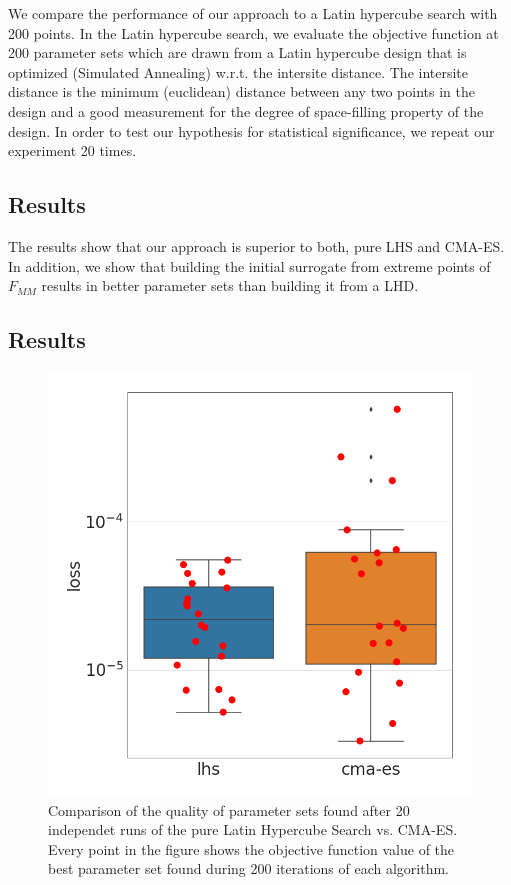 \documentclass[preprint,12pt]{elsarticle}
\begin{document}

We compare the performance of our approach to a Latin hypercube search with 200 points. In the Latin hypercube search, we evaluate the objective function at 200 parameter sets which are drawn from a Latin hypercube design that is optimized (Simulated Annealing) w.r.t. the intersite distance. The intersite distance is the minimum (euclidean) distance between any two points in the design and a good measurement for the degree of space-filling property of the design. In order to test our hypothesis for statistical significance, we repeat our experiment 20 times. 
\subsection{Results}
The results show that our approach is superior to both, pure LHS and CMA-ES.
In addition, we show that building the initial surrogate from extreme points of $F_{MM}$ results in better parameter sets than building it from a LHD.

\subsection{Results}
\begin{figure}[h]
\caption{Comparison of the quality of parameter sets found after 20 independet runs of the pure Latin Hypercube Search vs. CMA-ES. Every point in the figure shows the objective function value of the best parameter set found during 200 iterations of each algorithm.}
\centering
\includegraphics[scale=0.3]{images/lhs_vs_cmaes.png}
\end{figure}
\end{document}
